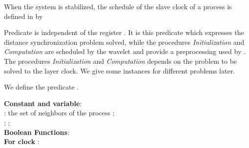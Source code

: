 \documentclass[11pt]{article}
\begin{document}
When the system is stabilized,  the schedule of the slave clock of a process  is defined in  by 
\begin{center}

\end{center}
Predicate  is independent of the register . It is this predicate which expresses  the distance   synchronization problem solved, 
while the procedures \emph{Initialization} and \emph{Computation} are 
scheduled by the wavelet and  provide a preprocessing used by .
The procedures \emph{Initialization} and \emph{Computation} depends on the problem to be solved to the layer clock.  
We give some instances for different problems later.  

We define the predicate .

\begin{algorithm}
\begin{footnotesize}
\noindent
{\bf Constant and variable}:\\
\hspace*{0.3cm}
: the set of neighbors of the process ;  \\
\noindent
;
;\\
\noindent
{\bf Boolean Functions}:\\
\noindent
{\bf For clock }:
\noindent


\end{footnotesize}
\end{algorithm}
\end{document}
